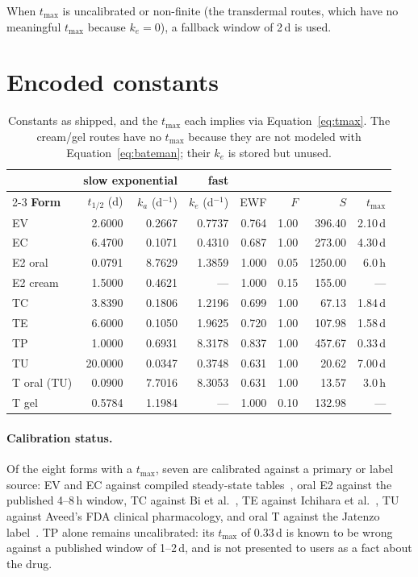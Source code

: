\documentclass[11pt,a4paper]{article}
\begin{document}
When $t_{\max}$ is uncalibrated or non-finite (the transdermal routes,
which have no meaningful $t_{\max}$ because $k_e = 0$), a fallback
window of 2\,d is used.

\section{Encoded constants}
\label{sec:constants}

\begin{table}[h]
\centering
\small
\begin{tabular}{@{}lrrrrrrr@{}}
\toprule
& \multicolumn{2}{c}{\textbf{slow exponential}} & \textbf{fast} & & & & \\
\cmidrule(lr){2-3}
\textbf{Form} & $t_{1/2}$ (d) & $k_a$ (d$^{-1}$) & $k_e$ (d$^{-1}$)
               & EWF & $F$ & $S$ & $t_{\max}$ \\
\midrule
EV            & 2.6000 & 0.2667 & 0.7737 & 0.764 & 1.00 & 396.40 & 2.10\,d \\
EC            & 6.4700 & 0.1071 & 0.4310 & 0.687 & 1.00 & 273.00 & 4.30\,d \\
E2 oral       & 0.0791 & 8.7629 & 1.3859 & 1.000 & 0.05 & 1250.00 & 6.0\,h \\
E2 cream      & 1.5000 & 0.4621 & ---    & 1.000 & 0.15 & 155.00 & --- \\
\midrule
TC            & 3.8390 & 0.1806 & 1.2196 & 0.699 & 1.00 & 67.13 & 1.84\,d \\
TE            & 6.6000 & 0.1050 & 1.9625 & 0.720 & 1.00 & 107.98 & 1.58\,d \\
TP            & 1.0000 & 0.6931 & 8.3178 & 0.837 & 1.00 & 457.67 & 0.33\,d \\
TU            & 20.0000 & 0.0347 & 0.3748 & 0.631 & 1.00 & 20.62 & 7.00\,d \\
T oral (TU)   & 0.0900 & 7.7016 & 8.3053 & 0.631 & 1.00 & 13.57 & 3.0\,h \\
T gel         & 0.5784 & 1.1984 & ---    & 1.000 & 0.10 & 132.98 & --- \\
\bottomrule
\end{tabular}
\caption{Constants as shipped, and the $t_{\max}$ each implies via
Equation~\ref{eq:tmax}. The cream/gel routes have no $t_{\max}$ because
they are not modeled with Equation~\ref{eq:bateman}; their $k_e$ is
stored but unused.}
\label{tab:constants}
\end{table}

\paragraph{Calibration status.} Of the eight forms with a $t_{\max}$,
seven are calibrated against a primary or label source: EV and EC
against compiled steady-state tables~\cite{tfs}, oral E2 against the
published 4--8\,h window, TC against Bi et al.~\cite{bi2018}, TE against
Ichihara et al.~\cite{ichihara2020}, TU against Aveed's FDA clinical
pharmacology, and oral T against the Jatenzo label~\cite{swerdloff2020}.
TP alone remains uncalibrated: its $t_{\max}$ of 0.33\,d is known to be
wrong against a published window of 1--2\,d, and is not presented to
users as a fact about the drug.
\end{document}

